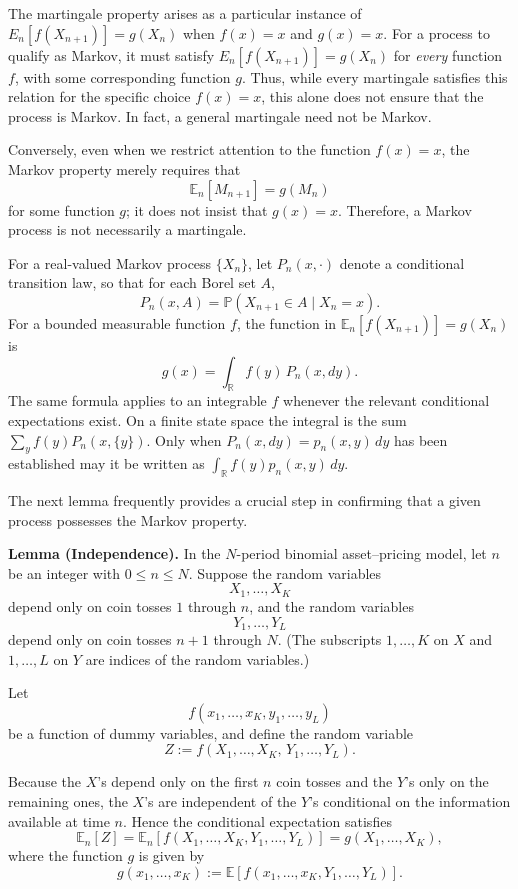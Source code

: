 The martingale property arises as a particular instance of ${E}_n[f(X_{n+1})] = g(X_n)$ when  $f(x) = x$ and $g(x) = x$. For a process to qualify as Markov, it must satisfy ${E}_n[f(X_{n+1})] = g(X_n)$ for \emph{every} function $f$, with some corresponding function $g$.
Thus, while every martingale satisfies this relation for the specific choice $f(x) = x$, this alone does not ensure that the process is Markov. In fact, a general martingale need not be Markov.

Conversely, even when we restrict attention to the function $f(x) = x$, the Markov property merely requires that 
\[
\mathbb{E}_n[M_{n+1}] = g(M_n)
\]
for some function $g$; it does not insist that $g(x) = x$. Therefore, a Markov process is not necessarily a martingale.

\begin{definition}
For a real-valued Markov process $\{X_n\}$, let $P_n(x,\cdot)$ denote
a conditional transition law, so that for each Borel set $A$,
\[
P_n(x,A)=\mathbb P(X_{n+1}\in A\mid X_n=x).
\]
For a bounded measurable function $f$, the function in
$\mathbb E_n[f(X_{n+1})]=g(X_n)$ is
\[
g(x)=\int_{\mathbb R} f(y)\,P_n(x,dy).
\]
The same formula applies to an integrable $f$ whenever the relevant
conditional expectations exist. On a finite state space the integral
is the sum $\sum_y f(y)P_n(x,\{y\})$. Only when
$P_n(x,dy)=p_n(x,y)\,dy$ has been established may it be written as
$\int_{\mathbb R} f(y)p_n(x,y)\,dy$.
\end{definition}


The next lemma frequently provides a crucial step in confirming that a
given process possesses the Markov property.

\textbf{Lemma (Independence).}
In the $N$-period binomial asset–pricing model, let $n$ be an integer with $0 \leq n \leq N$. Suppose the random variables
\[
X_1,\ldots,X_K
\]
depend only on coin tosses $1$ through $n$, and the random variables
\[
Y_1,\ldots,Y_L
\]
depend only on coin tosses $n+1$ through $N$.  
(The subscripts $1,\ldots,K$ on $X$ and $1,\ldots,L$ on $Y$
are indices of the random variables.)

Let 
\[
f(x_1,\ldots,x_K,y_1,\ldots,y_L)
\]
be a function of dummy variables, and define the random variable
\begin{equation}
Z := f(X_1,\ldots,X_K,\,Y_1,\ldots,Y_L).
\end{equation}

Because the $X$'s depend only on the first $n$ coin tosses and the $Y$'s only on the remaining ones, the $X$'s are independent of the $Y$'s conditional on the information available at time $n$. Hence the conditional expectation satisfies
\begin{equation}
\mathbb{E}_n[Z]
  = \mathbb{E}_n\!\left[ f(X_1,\ldots,X_K,Y_1,\ldots,Y_L) \right]
  = g(X_1,\ldots,X_K),
\end{equation}
where the function $g$ is given by
\[
g(x_1,\ldots,x_K)
   := \mathbb{E}\!\left[ f(x_1,\ldots,x_K,Y_1,\ldots,Y_L) \right].
\]

